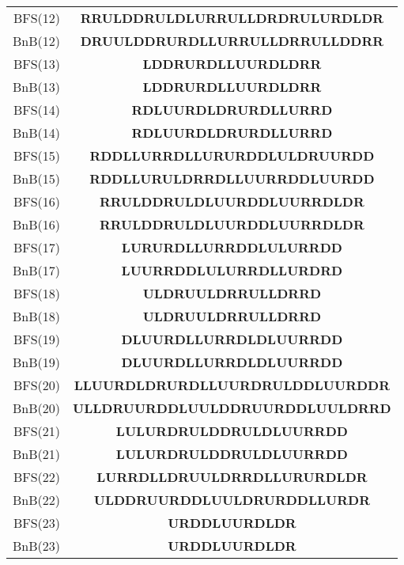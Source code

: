 \begin{table}[ht]
\begin{adjustbox}{width=0.6\textwidth,center}
\begin{tabular}{r|c}
BFS(12) & \textbf{RRULDDRULDLURRULLDRDRULURDLDR} \\
BnB(12) & \textbf{DRUULDDRURDLLURRULLDRRULLDDRR} \\ \hline

BFS(13) & \textbf{LDDRURDLLUURDLDRR} \\
BnB(13) & \textbf{LDDRURDLLUURDLDRR} \\ \hline

BFS(14) & \textbf{RDLUURDLDRURDLLURRD} \\
BnB(14) & \textbf{RDLUURDLDRURDLLURRD} \\ \hline

BFS(15) & \textbf{RDDLLURRDLLURURDDLULDRUURDD} \\
BnB(15) & \textbf{RDDLLURULDRRDLLUURRDDLUURDD} \\ \hline

BFS(16) & \textbf{RRULDDRULDLUURDDLUURRDLDR} \\
BnB(16) & \textbf{RRULDDRULDLUURDDLUURRDLDR} \\ \hline

BFS(17) & \textbf{LURURDLLURRDDLULURRDD} \\
BnB(17) & \textbf{LUURRDDLULURRDLLURDRD} \\ \hline

BFS(18) & \textbf{ULDRUULDRRULLDRRD} \\
BnB(18) & \textbf{ULDRUULDRRULLDRRD} \\ \hline

BFS(19) & \textbf{DLUURDLLURRDLDLUURRDD} \\
BnB(19) & \textbf{DLUURDLLURRDLDLUURRDD} \\ \hline

BFS(20) & \textbf{LLUURDLDRURDLLUURDRULDDLUURDDR} \\
BnB(20) & \textbf{ULLDRUURDDLUULDDRUURDDLUULDRRD} \\ \hline

BFS(21) & \textbf{LULURDRULDDRULDLUURRDD} \\
BnB(21) & \textbf{LULURDRULDDRULDLUURRDD} \\ \hline

BFS(22) & \textbf{LURRDLLDRUULDRRDLLURURDLDR} \\
BnB(22) & \textbf{ULDDRUURDDLUULDRURDDLLURDR} \\ \hline

BFS(23) & \textbf{URDDLUURDLDR} \\
BnB(23) & \textbf{URDDLUURDLDR} \\ \hline


\end{tabular}
\end{adjustbox}
\end{table}
